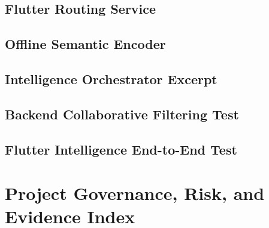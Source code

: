 \clearpage
\section{Flutter Routing Service}


\clearpage
\section{Offline Semantic Encoder}


\clearpage
\section{Intelligence Orchestrator Excerpt}


\clearpage
\section{Backend Collaborative Filtering Test}


\clearpage
\section{Flutter Intelligence End-to-End Test}


\chapter{Project Governance, Risk, and Evidence Index}
\label{app:governance}

